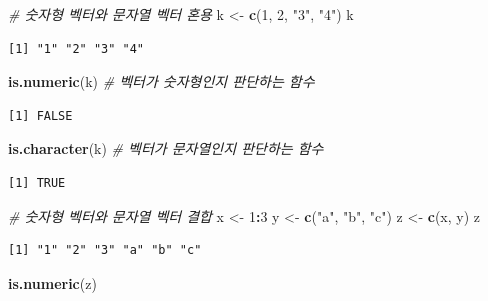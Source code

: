 \documentclass[
  11pt,
]{krantz}
\newenvironment{Shaded}{\begin{snugshade}}{\end{snugshade}}
\newcommand{\CommentTok}[1]{\textcolor[rgb]{0.37,0.37,0.37}{\textit{#1}}}
\newcommand{\DecValTok}[1]{\textcolor[rgb]{0.06,0.06,0.06}{#1}}
\newcommand{\KeywordTok}[1]{\textcolor[rgb]{0.27,0.27,0.27}{\textbf{#1}}}
\newcommand{\NormalTok}[1]{#1}
\newcommand{\OperatorTok}[1]{\textcolor[rgb]{0.43,0.43,0.43}{\textbf{#1}}}
\newcommand{\StringTok}[1]{\textcolor[rgb]{0.5,0.5,0.5}{#1}}
\begin{document}
\footnotesize

\begin{Shaded}
\begin{Highlighting}[]
\CommentTok{# 숫자형 벡터와 문자열 벡터 혼용}
\NormalTok{k <-}\StringTok{ }\KeywordTok{c}\NormalTok{(}\DecValTok{1}\NormalTok{, }\DecValTok{2}\NormalTok{, }\StringTok{"3"}\NormalTok{, }\StringTok{"4"}\NormalTok{)}
\NormalTok{k}
\end{Highlighting}
\end{Shaded}

\begin{verbatim}
[1] "1" "2" "3" "4"
\end{verbatim}

\begin{Shaded}
\begin{Highlighting}[]
\KeywordTok{is.numeric}\NormalTok{(k) }\CommentTok{# 벡터가 숫자형인지 판단하는 함수}
\end{Highlighting}
\end{Shaded}

\begin{verbatim}
[1] FALSE
\end{verbatim}

\begin{Shaded}
\begin{Highlighting}[]
\KeywordTok{is.character}\NormalTok{(k) }\CommentTok{# 벡터가 문자열인지 판단하는 함수}
\end{Highlighting}
\end{Shaded}

\begin{verbatim}
[1] TRUE
\end{verbatim}

\begin{Shaded}
\begin{Highlighting}[]
\CommentTok{# 숫자형 벡터와 문자열 벡터 결합}
\NormalTok{x <-}\StringTok{ }\DecValTok{1}\OperatorTok{:}\DecValTok{3}
\NormalTok{y <-}\StringTok{ }\KeywordTok{c}\NormalTok{(}\StringTok{"a"}\NormalTok{, }\StringTok{"b"}\NormalTok{, }\StringTok{"c"}\NormalTok{)}
\NormalTok{z <-}\StringTok{ }\KeywordTok{c}\NormalTok{(x, y)}
\NormalTok{z}
\end{Highlighting}
\end{Shaded}

\begin{verbatim}
[1] "1" "2" "3" "a" "b" "c"
\end{verbatim}

\begin{Shaded}
\begin{Highlighting}[]
\KeywordTok{is.numeric}\NormalTok{(z)}
\end{Highlighting}
\end{Shaded}
\end{document}
